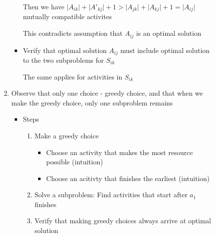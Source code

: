 \documentclass[12pt]{article}
\begin{document}
\begin{enumerate}[1.]
\begin{itemize}
\begin{itemize}
\begin{enumerate}[1.]
\begin{itemize}
\begin{mdframed}
                        Then we have $\lvert A_{ik} \rvert + \lvert A'_{kj} \rvert + 1 > \lvert A_{jk} \rvert + \lvert A_{kj} \rvert + 1 = \lvert A_{ij} \rvert$ mutually compatible activites

                        \bigskip

                        This contradicts assumption that $A_{ij}$ is an optimal solution
                    \end{mdframed}

                    \item Verify that optimal solution $A_{ij}$ must include optimal solution to the two subproblems
                    for $S_{ik}$

                    \begin{mdframed}
                    The same applies for activities in $S_{ik}$
                    \end{mdframed}
                \end{itemize}

                \item Observe that only one choice - greedy choice, and that when we make the greedy choice, only one subproblem remains

                \begin{itemize}
                    \item Steps

                    \begin{enumerate}[1.]
                        \item Make a greedy choice
                        \begin{itemize}
                            \item Choose an activity that makes the most resource possible (intuition)
                            \item Choose an acitivty that finishes the earliest (intuition)
                        \end{itemize}
                        \item Solve a subproblem: Find activities that start after $a_1$ finishes
                        \item Verify that making greedy choices always arrive at optimal solution
                    \end{enumerate}
                \end{itemize}

                \bigskip


\end{enumerate}
\end{itemize}
\end{itemize}
\end{enumerate}
\end{document}

